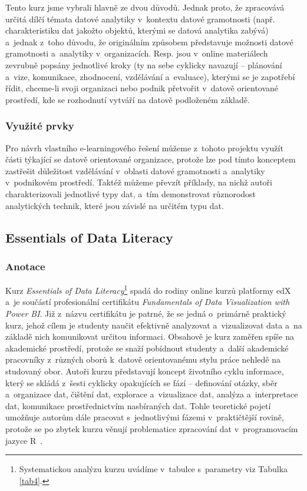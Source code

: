 Tento kurz jsme vybrali hlavně ze dvou důvodů. Jednak proto, že zpracovává určitá dílčí témata datové analytiky v~kontextu datové gramotnosti (např. charakteristiku dat jakožto objektů, kterými se datová analytika zabývá) a~jednak z~toho důvodu, že originálním způsobem představuje možnosti datové gramotnosti a~analytiky v~organizacích. Resp. jsou v~online materiálech zevrubně popsány jednotlivé kroky (ty na sebe cyklicky navazují -- plánování a~vize, komunikace, zhodnocení, vzdělávání a~evaluace), kterými se je zapotřebí řídit, chceme-li svoji organizaci nebo podnik přetvořit v~datově orientované prostředí, kde se rozhodnutí vytváří na datově podloženém základě.

\hypertarget{vyuux17eituxe9-prvky-2}{%
\subsubsection{Využité prvky}\label{vyuux17eituxe9-prvky-2}}

Pro návrh vlastního e-learningového řešení můžeme z~tohoto projektu využít části týkající se datově orientované organizace, protože lze pod tímto konceptem zastřešit důležitost vzdělávání v~oblasti datové gramotnosti a~analytiky v~podnikovém prostředí. Taktéž můžeme převzít příklady, na nichž autoři charakterizovali jednotlivé typy dat, a~tím demonstrovat různorodost analytických technik, které jsou závislé na určitém typu dat.

\hypertarget{essentials-of-data-literacy}{%
\subsection{Essentials of Data Literacy}\label{essentials-of-data-literacy}}

\hypertarget{anotace-3}{%
\subsubsection{Anotace}\label{anotace-3}}

Kurz \emph{Essentials of Data Literacy}\footnote{Systematickou analýzu kurzu uvádíme v~tabulce s~parametry viz Tabulka \ref{tab4}.} spadá do rodiny online kurzů platformy edX a~je součástí profesionální certifikátu \emph{Fundamentals of Data Visualization with Power BI}. Již z~názvu certifikátu je patrné, že se jedná o~primárně praktický kurz, jehož cílem je studenty naučit efektivně analyzovat a~vizualizovat data a~na základě nich komunikovat určitou informaci. Obsahově je kurz zaměřen spíše na akademické prostředí, protože se snaží pobídnout studenty a~další akademické pracovníky z~různých oborů k~datově orientovanému stylu práce nehledě na studovaný obor. Autoři kurzu představují koncept životního cyklu informace, který se skládá z~šesti cyklicky opakujících se fází -- definování otázky, sběr a~organizace dat, čištění dat, explorace a~vizualizace dat, analýza a~interpretace dat, komunikace prostřednictvím nasbíraných dat. Tohle teoretické pojetí umožňuje autorům dále pracovat s~jednotlivými fázemi v~praktičtější rovině, protože se po zbytek kurzu věnují problematice zpracování dat v~programovacím jazyce R~\parencite{course4}.

